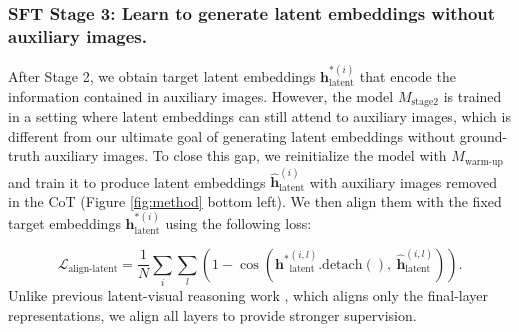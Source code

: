 \begin{table}[t]
    \centering
    \caption{\textbf{Ablation of the components of the SFT Stage 2.} ``Monet-SFT'' denotes the full SFT pipeline. ``w/o latent-only BP'' represents without latent-only backpropagation for the alignment loss. ``w/o auxiliary img'' disables attention from latent embeddings to auxiliary-image embeddings in the student CoT. Both ablation lead to performance degradation on almost all tasks.}
    \label{tab:ablation_sft}
\end{table}



\subsubsection{SFT Stage 3: Learn to generate latent embeddings without auxiliary images.} After Stage 2, we obtain target latent embeddings $\mathbf{h}^{*(i)}_{\text{latent}}$ that encode the information contained in auxiliary images. However, the model $M_{\text{stage2}}$ is trained in a setting where latent embeddings can still attend to auxiliary images, which is different from our ultimate goal of generating latent embeddings without ground-truth auxiliary images. To close this gap, we reinitialize the model with $M_{\text{warm-up}}$ and train it to produce latent embeddings $\hat{\mathbf{h}}^{(i)}_{\text{latent}}$ with auxiliary images removed in the CoT (Figure \ref{fig:method} bottom left). We then align them with the fixed target embeddings $\mathbf{h}^{*(i)}_{\text{latent}}$ using the following loss:

\begin{equation}
    \mathcal{L}_{\text{align-latent}} = \frac{1}{N}\sum_i \sum_l \left( 1-\cos ({\mathbf{h^*}^{(i, l)}_{\text{latent}}}.\operatorname{detach()}, ~{\hat{\mathbf{h}}^{(i, l)}_{\text{latent}}}) \right).
\end{equation}
Unlike previous latent-visual reasoning work \citep{yang2025machine, li2025latent}, which aligns only the final-layer representations, we align all layers to provide stronger supervision.

